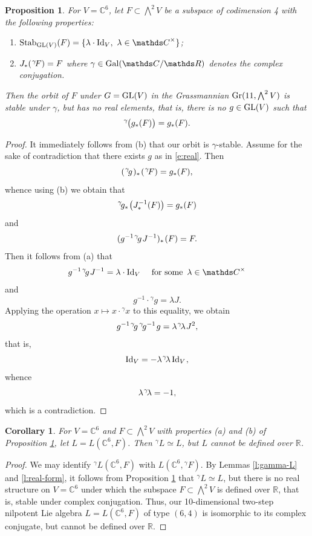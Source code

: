 \documentclass[11pt]{amsart}
\theoremstyle{plain}
\newtheorem{proposition}[theorem]{Proposition}
\newtheorem{corollary}[theorem]{Corollary}
\theoremstyle{definition}
\newcommand{\hs}{\kern 0.8pt}
\newcommand{\C}{{\mathds C}}
\newcommand{\R}{{\mathds R}}
\newcommand{\GL}{{\rm GL}}
\newcommand{\Stab}{{\rm Stab}}
\newcommand{\Id}{{\rm Id}}
\newcommand{\upgam}{{{}^\gamma\!}}
\renewcommand{\Lambda}{\textstyle\bigwedge}
\begin{document}
\begin{proposition}\label{p:real-orbit}
For $V=\C^6$, let $F\subset \Lambda^2 V$ be a subspace of codimension 4  with the following properties:
\begin{enumerate}
\item[\rm (a)] $\Stab_{\GL(V)}(F)=\{\lambda\cdot\Id_V,\ \lambda\in \C^\times\}$;
\item[\rm (b)] $J_*(\hs\upgam F)=  F$ where $\gamma\in{\rm Gal}(\C/\R)$ denotes the complex conjugation.
\end{enumerate}
Then the orbit of $F$ under $G=\GL(V)$ in the Grassmannian ${\rm Gr}(11,\Lambda^2 V)$
is stable under $\gamma$, but has no real elements,
that is, there is no $g\in\GL(V)$ such that
\begin{equation}\label{e:real}
\upgam\hs\big (g_*(F)\big)=g_*(F).
\end{equation}
\end{proposition}

\begin{proof}
It immediately follows from (b) that our orbit is $\gamma$-stable.
Assume for the sake of contradiction that there exists  $g$ as in \eqref{e:real}.
Then
\[ (\hs\upgam g\hs)_*\hs(\hs\upgam F)= g_*(F),\]
whence using (b) we obtain that
\[ \upgam g_*\hs\big(J_*^{-1} (F)\big)
=g_*(F)\]
and
\[(g^{-1}\hs \upgam g\hs J^{-1})_*\hs(F)= F.\]
Then it follows from (a) that
\[g^{-1}\hs\upgam g\hs J^{-1} = \lambda\cdot {\rm Id}_V\quad\ \text{for some}\ \, \lambda\in \C^\times\]
and
\[g^{-1}\cdot\upgam g =\lambda J.\]
Applying the operation $x\mapsto x\cdot \upgam x$ to this equality, we obtain
\[g^{-1}\hs\upgam g\, \upgam g^{-1}\hs g=\lambda\hs\upgam \lambda\hs J^2,\]
that is,
\[\Id_V=-\lambda\hs\upgam\lambda\,\Id_V\hs,\]
whence
\[\lambda\hs\upgam\lambda=-1,\]
which is a contradiction.
\end{proof}

\begin{corollary}
For $V=\C^6$ and $F\subset \Lambda^2 V$ with properties  (a) and (b)
of Proposition \ref{p:real-orbit}, let $L=L(\C^6,F)$.
Then $\upgam L\simeq L$, but $L$ cannot be defined over $\R$.
\end{corollary}

\begin{proof}
We may identify $\upgam L(\C^6,F)$ with $L(\C^6,\upgam F)$.
By Lemmas \ref{l:gamma-L} and \ref{l:real-form},
it follows from Proposition \ref{p:real-orbit}
that $\upgam L \simeq L$, but there is no real structure on $V=\C^6$
under which the subspace  $F\subset \Lambda^2 V$ is defined over $\R$,
that is, stable under complex conjugation.
Thus, our 10-dimensional two-step nilpotent Lie algebra $L=L(\C^6,F)$ of type $(6,4)$
is isomorphic to its complex conjugate, but cannot be defined over $\R$.
\end{proof}
\end{document}
